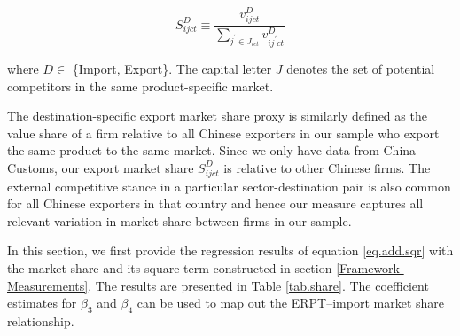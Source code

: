\documentclass[12pt]{article}
\begin{document}
$$
S^{D}_{ijct} \equiv \frac{v^{D}_{ijct}}{\sum_{j^{\prime} \in J_{ict}} v^{D}_{ij^{\prime}ct}}
$$

where $D \in$ \{Import, Export\}. The capital letter $J$ denotes the set of potential competitors in the same product-specific market. 

The destination-specific export market share proxy is similarly defined as the value share of a firm relative to all Chinese exporters in our sample who export the same product to the same market. Since we only have data from China Customs, our export market share $S^{D}_{ijct}$ is relative to other Chinese firms. The external competitive stance in a particular sector-destination pair is also common for all Chinese exporters in that country and hence our measure captures all relevant variation in market share between firms in our sample.


In this section, we first provide the regression results of equation \ref{eq.add.sqr} with the market share and its square term constructed in section \ref{Framework-Measurements}. The results are presented in Table \ref{tab.share}. The coefficient estimates for $\beta_3$ and $\beta_4$ can be used to map out the ERPT–import market share relationship.
\end{document}
